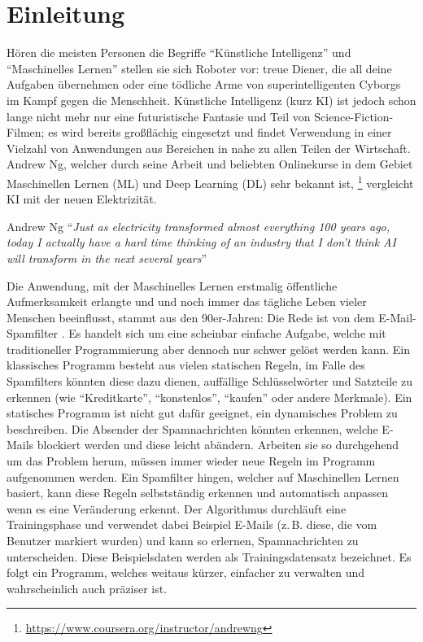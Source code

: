 \chapter{Einleitung}
Hören die meisten Personen die Begriffe \enquote{Künstliche Intelligenz}
und \enquote{Maschinelles Lernen} stellen sie sich Roboter vor:
treue Diener, die all deine Aufgaben übernehmen oder eine tödliche Arme
von superintelligenten Cyborgs im Kampf gegen die Menschheit.
Künstliche Intelligenz (kurz KI) ist jedoch schon lange nicht mehr nur eine futuristische
Fantasie und Teil von Science-Fiction-Filmen; es wird bereits großflächig
eingesetzt und findet Verwendung in einer Vielzahl von Anwendungen aus Bereichen
in nahe zu allen Teilen der Wirtschaft. Andrew Ng,
welcher durch seine Arbeit und beliebten Onlinekurse
in dem Gebiet Maschinellen Lernen (ML) und Deep Learning (DL)
sehr bekannt ist,
\footnote{\url{https://www.coursera.org/instructor/andrewng}}
vergleicht KI mit der neuen Elektrizität.
\begin{aquote}{Andrew Ng \parencite{online:ai-andrew-ng}}
  \enquote{\textit{Just as electricity transformed almost everything 100 years ago,
      today I actually have a hard time thinking
      of an industry that I don’t think AI will
      transform in the next several years}}
\end{aquote}
Die Anwendung, mit der Maschinelles Lernen erstmalig öffentliche Aufmerksamkeit
erlangte und und noch immer das tägliche Leben vieler Menschen beeinflusst,
stammt aus den 90er-Jahren:
Die Rede ist von dem E-Mail-Spamfilter \parencite[1]{book:hands-on-ml}.
Es handelt sich um eine scheinbar einfache Aufgabe, welche
mit traditioneller Programmierung aber dennoch nur schwer gelöst werden kann.
Ein klassisches Programm besteht aus vielen statischen Regeln,
im Falle des Spamfilters könnten diese dazu dienen, auffällige Schlüsselwörter und
Satzteile zu erkennen (wie \enquote{Kreditkarte}, \enquote{konstenlos}, \enquote{kaufen} oder
andere Merkmale).
Ein statisches Programm ist nicht gut dafür geeignet, ein dynamisches Problem
zu beschreiben. Die Absender der Spamnachrichten könnten erkennen, welche E-Mails blockiert werden
und diese leicht abändern. Arbeiten sie so durchgehend um das Problem herum,
müssen immer wieder neue Regeln im Programm aufgenommen werden. Ein Spamfilter hingen,
welcher auf Maschinellen Lernen basiert, kann diese Regeln
selbstständig erkennen und automatisch anpassen wenn es eine Veränderung erkennt.
Der Algorithmus durchläuft eine Trainingsphase und verwendet dabei
Beispiel E-Mails (z.\,B. diese, die vom Benutzer markiert wurden)
und kann so erlernen, Spamnachrichten zu unterscheiden.
Diese Beispielsdaten werden als Trainingsdatensatz bezeichnet.
Es folgt ein Programm, welches weitaus kürzer,
einfacher zu verwalten und wahrscheinlich auch präziser ist.

